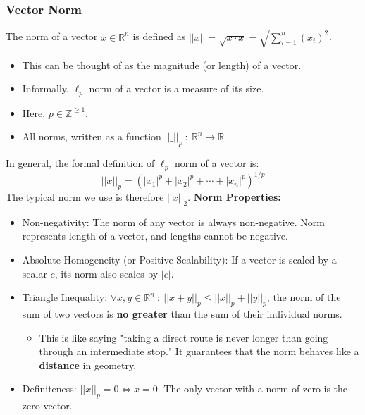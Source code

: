 \documentclass[10pt]{article}
\begin{document}
\subsubsection*{Vector Norm}
The norm of a vector $x \in \mathbb{R}^n$ is defined as $||x|| = \sqrt{x \cdot x} = \sqrt{\sum_{i = 1}^n (x_i)^2}$.
\begin{itemize}
	\item This can be thought of as the magnitude (or length) of a vector.
	\item Informally, $\ell_p$ norm of a vector is a measure of its size.
	\item Here, $p \in \mathbb{Z}^{\geq 1}$.
	\item All norms, written as a function $||\_||_p \::\: \mathbb{R}^n \rightarrow \mathbb{R}$
\end{itemize}
In general, the formal definition of $\ell_p$ norm of a vector is:
\[||x||_p = (|x_1|^p + |x_2|^p + \cdots + |x_n|^p)^{1 / p}\]
The typical norm we use is therefore $||x||_2$.
\textbf{Norm Properties:}
\begin{itemize}
	\item Non-negativity: The norm of any vector is always non-negative.  Norm represents length of a vector, and lengths cannot be negative.
	\item Absolute Homogeneity (or Positive Scalability): If a vector is scaled by a scalar $c$, its norm also scales by $|c|$.
	\item Triangle Inequality: $\forall x, y \in \mathbb{R}^n \::\: ||x + y||_p \leq ||x||_p + ||y||_p$, the norm of the sum of two vectors is \textbf{no greater} than the sum of their individual norms.
	\begin{itemize}
	    \item This is like saying "taking a direct route is never longer than going through an intermediate stop."  It guarantees that the norm behaves like a \textbf{distance} in geometry.
    \end{itemize}
    \item Definiteness:  $||x||_p = 0 \Leftrightarrow x = 0$.  The only vector with a norm of zero is the zero vector.
\end{itemize}
\end{document}

